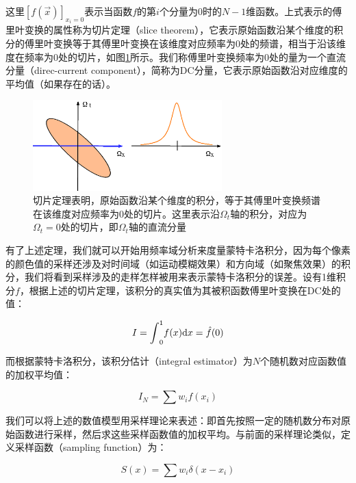 \noindent 这里$[f(\vec{x})]_{x_i=0}$表示当函数$f$的第$i$个分量为0时的$N-1$维函数。上式表示的傅里叶变换的属性称为切片定理（slice theorem），它表示原始函数沿某个维度的积分的傅里叶变换等于其傅里叶变换在该维度对应频率为0处的频谱，相当于沿该维度在频率为0处的切片，如图\ref{f:pt-slice}所示。我们称傅里叶变换频率为0处的量为一个直流分量（direc-current component），简称为DC分量，它表示原始函数沿对应维度的平均值（如果存在的话）。

\begin{figure}
	\sidecaption
	\includegraphics[width=0.65\textwidth]{figures/pt/slice-theorem}
	\caption{切片定理表明，原始函数沿某个维度的积分，等于其傅里叶变换频谱在该维度对应频率为0处的切片。这里表示沿$\Omega_t$轴的积分，对应为$\Omega_t=0$处的切片，即$\Omega_t$轴的直流分量}
	\label{f:pt-slice}
\end{figure}

有了上述定理，我们就可以开始用频率域分析来度量蒙特卡洛积分，因为每个像素的颜色值的采样还涉及对时间域（如运动模糊效果）和方向域（如聚焦效果）的积分，我们将看到采样涉及的走样怎样被用来表示蒙特卡洛积分的误差。设有1维积分$f$，根据上述的切片定理，该积分的真实值为其被积函数傅里叶变换在DC处的值：

\begin{equation}
	I={\rm \int}^{1}_0 f(x){\rm d}x=\hat{f}(0)
\end{equation}

而根据蒙特卡洛积分，该积分估计（integral estimator）为$N$个随机数对应函数值的加权平均值：

\begin{equation}\label{eq:pt-setimator-sum}
	I_N=\sum w_i f(x_i)
\end{equation}

我们可以将上述的数值模型用采样理论来表述：即首先按照一定的随机数分布对原始函数进行采样，然后求这些采样函数值的加权平均。与前面的采样理论类似，定义采样函数（sampling function）为：

\begin{equation}
	S(x)=\sum w_i\delta(x-x_i)
\end{equation}

